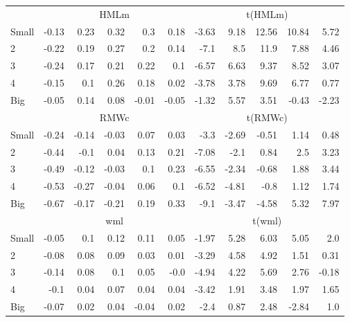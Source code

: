 \begin{table}[!ht]
\begin{tabular}{lrrrrrrrrrr}
  

      & \multicolumn{5}{c}{HMLm} & \multicolumn{5}{c}{t(HMLm)} \\
    \cmidrule(r){2-6} \cmidrule(r){7-11}
      Small  & -0.13  & 0.23  & 0.32  & 0.3  & 0.18   & -3.63  & 9.18  & 12.56  & 10.84  & 5.72  \\
          2  & -0.22  & 0.19  & 0.27  & 0.2  & 0.14   & -7.1  & 8.5  & 11.9  & 7.88  & 4.46  \\
          3  & -0.24  & 0.17  & 0.21  & 0.22  & 0.1   & -6.57  & 6.63  & 9.37  & 8.52  & 3.07  \\
          4  & -0.15  & 0.1  & 0.26  & 0.18  & 0.02   & -3.78  & 3.78  & 9.69  & 6.77  & 0.77  \\
      Big    & -0.05  & 0.14  & 0.08  & -0.01  & -0.05   & -1.32  & 5.57  & 3.51  & -0.43  & -2.23  \\

  

      & \multicolumn{5}{c}{RMWc} & \multicolumn{5}{c}{t(RMWc)} \\
    \cmidrule(r){2-6} \cmidrule(r){7-11}
      Small  & -0.24  & -0.14  & -0.03  & 0.07  & 0.03   & -3.3  & -2.69  & -0.51  & 1.14  & 0.48  \\
          2  & -0.44  & -0.1  & 0.04  & 0.13  & 0.21   & -7.08  & -2.1  & 0.84  & 2.5  & 3.23  \\
          3  & -0.49  & -0.12  & -0.03  & 0.1  & 0.23   & -6.55  & -2.34  & -0.68  & 1.88  & 3.44  \\
          4  & -0.53  & -0.27  & -0.04  & 0.06  & 0.1   & -6.52  & -4.81  & -0.8  & 1.12  & 1.74  \\
      Big    & -0.67  & -0.17  & -0.21  & 0.19  & 0.33   & -9.1  & -3.47  & -4.58  & 5.32  & 7.97  \\

  

      & \multicolumn{5}{c}{wml} & \multicolumn{5}{c}{t(wml)} \\
    \cmidrule(r){2-6} \cmidrule(r){7-11}
      Small  & -0.05  & 0.1  & 0.12  & 0.11  & 0.05   & -1.97  & 5.28  & 6.03  & 5.05  & 2.0  \\
          2  & -0.08  & 0.08  & 0.09  & 0.03  & 0.01   & -3.29  & 4.58  & 4.92  & 1.51  & 0.31  \\
          3  & -0.14  & 0.08  & 0.1  & 0.05  & -0.0   & -4.94  & 4.22  & 5.69  & 2.76  & -0.18  \\
          4  & -0.1  & 0.04  & 0.07  & 0.04  & 0.04   & -3.42  & 1.91  & 3.48  & 1.97  & 1.65  \\
      Big    & -0.07  & 0.02  & 0.04  & -0.04  & 0.02   & -2.4  & 0.87  & 2.48  & -2.84  & 1.0  \\

  

  \bottomrule
\end{tabular}
\label{tbl:25_Size_OP_BS2015}
\end{table}